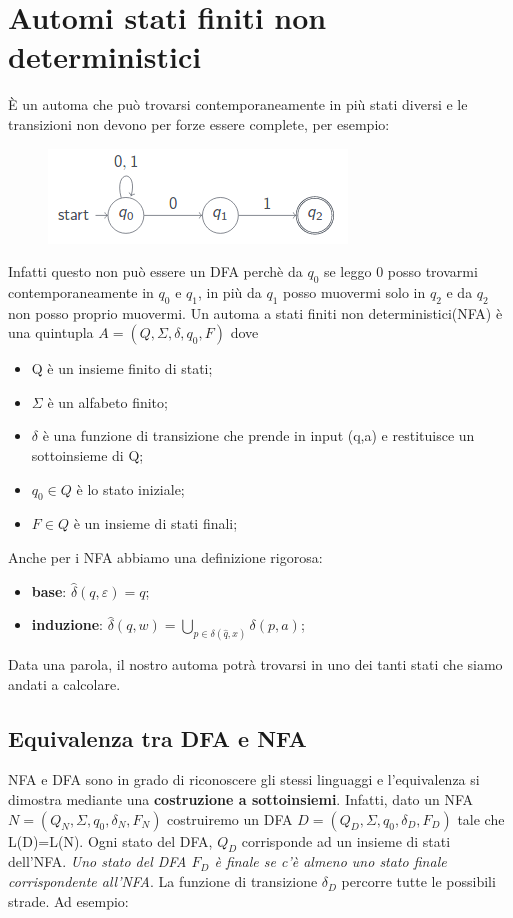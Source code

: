 \chapter{Automi stati finiti non deterministici}
È un automa che può trovarsi contemporaneamente in più stati diversi e le 
transizioni non devono per forze essere complete, per esempio: 

\begin{figure}[h]
\centering 
\includegraphics[scale=0.5]{Immagini/NFA.png}
\end{figure}

Infatti questo non può essere un DFA perchè da $q_0$ se leggo 0 posso trovarmi
contemporaneamente in $q_0$ e $q_1$, in più da $q_1$ posso muovermi solo in $q_2$ 
e da $q_2$ non posso proprio muovermi.
Un automa a stati finiti non deterministici(NFA) è una quintupla $A=(Q, \Sigma, 
\delta, q_0, F)$ dove
\begin{itemize}
\item Q è un insieme finito di stati;
\item $\Sigma$ è un alfabeto finito;
\item $\delta$ è una funzione di transizione che prende in input (q,a) e 
restituisce un sottoinsieme di Q;
\item $q_0 \in Q$ è lo stato iniziale;
\item $F \in Q$ è un insieme di stati finali;
\end{itemize}
Anche per i NFA abbiamo una definizione rigorosa:
\begin{itemize}
\item \textbf{base}: $\widehat{\delta}(q, \varepsilon)={q}$;
\item \textbf{induzione}: $\widehat{\delta}(q,w)=\bigcup_{p \in \delta 
(\widehat{q},x)}^{} \delta(p,a)$;
\end{itemize}
Data una parola, il nostro automa potrà trovarsi in uno dei tanti stati
che siamo andati a calcolare.

\section{Equivalenza tra DFA e NFA}
NFA e DFA sono in grado di riconoscere gli stessi linguaggi e l'equivalenza si
dimostra mediante una \textbf{costruzione a sottoinsiemi}. Infatti, dato un NFA
$N=(Q_N, \Sigma, q_0, \delta_N, F_N)$ costruiremo un DFA $D=(Q_D, \Sigma, {q_0}, 
\delta_D, F_D)$ tale che L(D)=L(N).
Ogni stato del DFA, $Q_D$ corrisponde ad un insieme di stati dell'NFA.
\textit{Uno stato del DFA $F_D$ è finale se c'è almeno uno stato finale
corrispondente all'NFA}. La funzione di transizione $\delta_D$ percorre tutte le
possibili strade. Ad esempio: 

